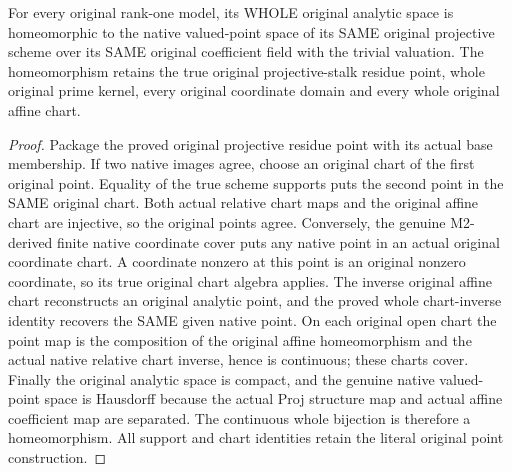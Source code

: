 \begin{theorem}
\label{thm:fc-native-rank-one-analytic-comparison}
\leanok
{}
For every original rank-one model, its WHOLE original analytic space is
homeomorphic to the native valued-point space of its SAME original
projective scheme over its SAME original coefficient field with the
trivial valuation. The homeomorphism retains the true original
projective-stalk residue point, whole original prime kernel, every
original coordinate domain and every whole original affine chart.
\end{theorem}
\begin{proof}
Package the proved original projective residue point with its actual
base membership. If two native images agree, choose an original chart
of the first original point. Equality of the true scheme supports puts
the second point in the SAME original chart. Both actual relative
chart maps and the original affine chart are injective, so the
original points agree. Conversely, the genuine M2-derived finite
native coordinate cover puts any native point in an actual original
coordinate chart. A coordinate nonzero at this point is an original
nonzero coordinate, so its true original chart algebra applies. The
inverse original affine chart reconstructs an original analytic point,
and the proved whole chart-inverse identity recovers the SAME given
native point. On each original open chart the point map is the
composition of the original affine homeomorphism and the actual native
relative chart inverse, hence is continuous; these charts cover.
Finally the original analytic space is compact, and the genuine native
valued-point space is Hausdorff because the actual Proj structure map
and actual affine coefficient map are separated. The continuous whole
bijection is therefore a homeomorphism. All support and chart
identities retain the literal original point construction.
\end{proof}
